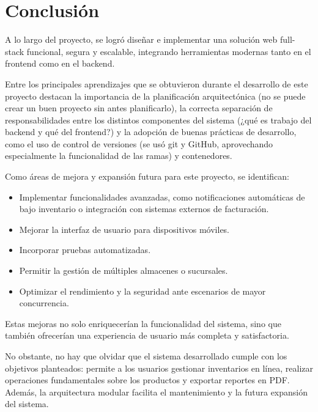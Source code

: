 \section{Conclusión}

A lo largo del proyecto, se logró diseñar e implementar una solución web full-stack funcional, segura y escalable, integrando herramientas modernas tanto en el frontend como en el backend.

Entre los principales aprendizajes que se obtuvieron durante el desarrollo de este proyecto destacan la importancia de la planificación arquitectónica (no se puede crear un buen proyecto sin antes planificarlo), la correcta separación de responsabilidades entre los distintos componentes del sistema (¿qué es trabajo del backend y qué del frontend?) y la adopción de buenas prácticas de desarrollo, como el uso de control de versiones (se usó git y GitHub, aprovechando especialmente la funcionalidad de las ramas) y contenedores.

Como áreas de mejora y expansión futura para este proyecto, se identifican:

\begin{itemize}
    \item Implementar funcionalidades avanzadas, como notificaciones automáticas de bajo inventario o integración con sistemas externos de facturación.
    \item Mejorar la interfaz de usuario para dispositivos móviles.
    \item Incorporar pruebas automatizadas.
    \item Permitir la gestión de múltiples almacenes o sucursales.
    \item Optimizar el rendimiento y la seguridad ante escenarios de mayor concurrencia.
\end{itemize}

Estas mejoras no solo enriquecerían la funcionalidad del sistema, sino que también ofrecerían una experiencia de usuario más completa y satisfactoria.

No obstante, no hay que olvidar que el sistema desarrollado cumple con los objetivos planteados: permite a los usuarios gestionar inventarios en línea, realizar operaciones fundamentales sobre los productos y exportar reportes en PDF. Además, la arquitectura modular facilita el mantenimiento y la futura expansión del sistema.
